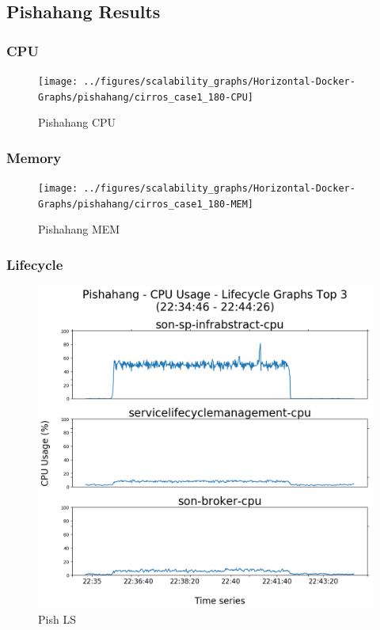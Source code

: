 \subsection{Pishahang Results}

\subsubsection{CPU}

\begin{figure}[h]
	\centering
	\texttt{[image: ../figures/scalability\_graphs/Horizontal-Docker-Graphs/pishahang/cirros\_case1\_180-CPU]}
	\caption{Pishahang CPU}
	\label{fig:cirroscase1180-cpu}
\end{figure}

\subsubsection{Memory}

\begin{figure}[h]
	\centering
	\texttt{[image: ../figures/scalability\_graphs/Horizontal-Docker-Graphs/pishahang/cirros\_case1\_180-MEM]}
	\caption{Pishahang MEM}
	\label{fig:cirroscase1180-mem}
\end{figure}


\subsubsection{Lifecycle}

\begin{figure}[h]
	\centering
	\includegraphics[width=0.7\linewidth]{figures/scalability_graphs/Lifecycle-Graphs-Top-3/Pishahang-TOP-3-Lifecycle}
	\caption{Pish LS}
	\label{fig:pishahang-top-3-lifecycle}
\end{figure}

